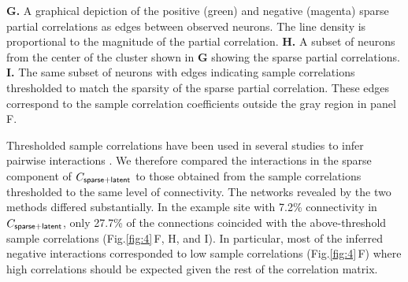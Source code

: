 \documentclass[10pt]{article}
\newcommand{\figref}[2]{Fig.\;\ref{fig:#1}\,#2}
\begin{document}
\begin{FPfigure}
{    {\bf G.} A graphical depiction of the positive (green) and negative (magenta) sparse partial correlations as edges between observed neurons. The line density is proportional to the magnitude of the partial correlation.
    {\bf H.} A subset of neurons from the center of the cluster shown in {\bf G} showing the sparse partial correlations.
    {\bf I.} The same subset of neurons with edges indicating sample correlations thresholded to match the sparsity of the sparse partial correlation. These edges correspond to the sample correlation coefficients outside the gray region in panel F.
}
\label{fig:4}
\end{FPfigure}

Thresholded sample correlations have been used in several studies to infer pairwise interactions \cite{Golshani:2009, Feldt:2011, Malmersjo:2013, Sadovsky:2014}.  We therefore compared the interactions in the sparse component of $C_{\sf sparse+latent}$ to those obtained from the sample correlations thresholded to the same level of connectivity. The networks revealed by the two methods differed substantially. In the example site with 7.2\% connectivity in $C_{\sf sparse+latent}$, only 27.7\% of the connections coincided with the above-threshold sample correlations (\figref{4}{F, H, and I}). In particular, most of the inferred negative interactions corresponded to low sample correlations (\figref{4}{F}) where high correlations should be expected given the rest of the correlation matrix.
\end{document}
